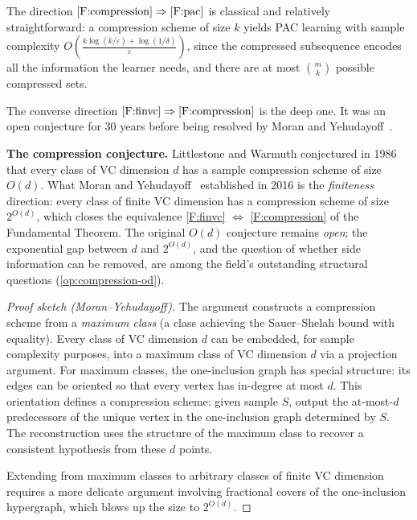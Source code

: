 The direction $\ref{F:compression} \Rightarrow \ref{F:pac}$ is classical
and relatively straightforward: a compression scheme of size $k$ yields PAC
learning with sample complexity $O\!\left(\frac{k\log(k/\varepsilon) +
\log(1/\delta)}{\varepsilon}\right)$, since the compressed subsequence encodes
all the information the learner needs, and there are at most $\binom{m}{k}$
possible compressed sets.

The converse direction $\ref{F:finvc} \Rightarrow \ref{F:compression}$ is the
deep one.  It was an open conjecture for 30 years before being resolved by
Moran and Yehudayoff~\cite{MoranYehudayoff2016}.

\begin{historical}
\textbf{The compression conjecture.}
Littlestone and Warmuth conjectured in 1986 that every class of VC dimension
$d$ has a sample compression scheme of size $O(d)$.  What Moran and
Yehudayoff~\cite{MoranYehudayoff2016} established in 2016 is the
\emph{finiteness} direction: every class of finite VC dimension has a
compression scheme of size $2^{O(d)}$, which closes the equivalence
\ref{F:finvc} $\Leftrightarrow$ \ref{F:compression} of the Fundamental
Theorem.  The original $O(d)$ conjecture remains \emph{open}; the
exponential gap between $d$ and $2^{O(d)}$, and the question of whether
side information can be removed, are among the field's outstanding
structural questions (\cref{op:compression-od}).
\end{historical}

\begin{proof}[Proof sketch (Moran--Yehudayoff)]
The argument constructs a compression scheme from a
\emph{maximum class} (a class achieving the Sauer--Shelah bound with
equality).  Every class of VC dimension $d$ can be embedded, for sample
complexity purposes, into a maximum class of VC dimension $d$ via a projection
argument.  For maximum classes, the one-inclusion graph has special structure:
its edges can be oriented so that every vertex has in-degree at most $d$.  This
orientation defines a compression scheme: given sample $S$, output the
at-most-$d$ predecessors of the unique vertex in the one-inclusion graph
determined by $S$.  The reconstruction uses the structure of the maximum class
to recover a consistent hypothesis from these $d$ points.

Extending from maximum classes to arbitrary classes of finite VC dimension
requires a more delicate argument involving fractional covers of the
one-inclusion hypergraph, which blows up the size to $2^{O(d)}$.
\end{proof}


